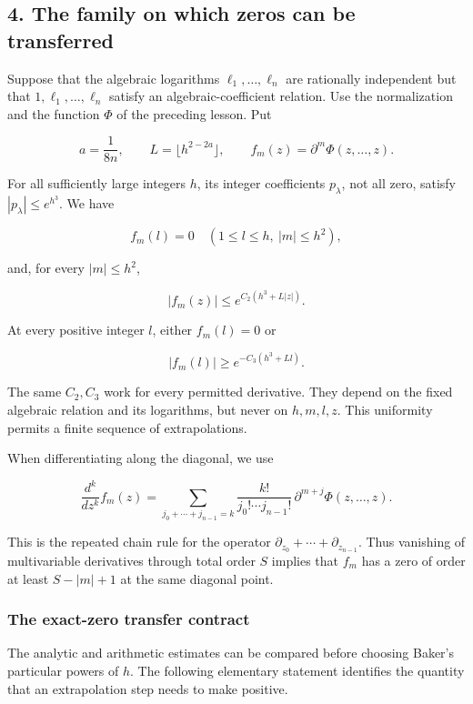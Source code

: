 \documentclass[
  11pt,
  a4paper,
]{article}
\begin{document}
\subsection{4. The family on which zeros can be
transferred}\label{the-family-on-which-zeros-can-be-transferred}

Suppose that the algebraic logarithms \(\ell_1,\ldots,\ell_n\) are
rationally independent but that \(1,\ell_1,\ldots,\ell_n\) satisfy an
algebraic-coefficient relation. Use the normalization and the function
\(\Phi\) of the preceding lesson. Put

\[
a=\frac1{8n},\qquad L=\lfloor h^{2-2a}\rfloor,\qquad
f_m(z)=\partial^m\Phi(z,\ldots,z).
\]

For all sufficiently large integers \(h\), its integer coefficients
\(p_\lambda\), not all zero, satisfy \(|p_\lambda|\le e^{h^3}\). We have

\[
f_m(l)=0\quad(1\le l\le h,\ |m|\le h^2), \tag{3.1}
\]

and, for every \(|m|\le h^2\),

\[
|f_m(z)|\le e^{C_2(h^3+L|z|)}. \tag{3.2}
\]

At every positive integer \(l\), either \(f_m(l)=0\) or

\[
|f_m(l)|\ge e^{-C_3(h^3+Ll)}. \tag{3.3}
\]

The same \(C_2,C_3\) work for every permitted derivative. They depend on
the fixed algebraic relation and its logarithms, but never on
\(h,m,l,z\). This uniformity permits a finite sequence of
extrapolations.

When differentiating along the diagonal, we use

\[
\frac{d^k}{dz^k}f_m(z)
=\sum_{j_0+\cdots+j_{n-1}=k}
\frac{k!}{j_0!\cdots j_{n-1}!}\,\partial^{m+j}\Phi(z,\ldots,z). \tag{3.4}
\]

This is the repeated chain rule for the operator
\(\partial_{z_0}+\cdots+\partial_{z_{n-1}}\). Thus vanishing of
multivariable derivatives through total order \(S\) implies that \(f_m\)
has a zero of order at least \(S-|m|+1\) at the same diagonal point.

\subsubsection{The exact-zero transfer
contract}\label{the-exact-zero-transfer-contract}

The analytic and arithmetic estimates can be compared before choosing
Baker's particular powers of \(h\). The following elementary statement
identifies the quantity that an extrapolation step needs to make
positive.
\end{document}
